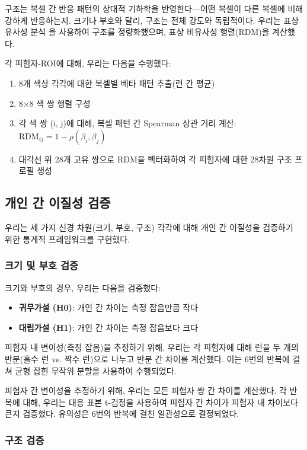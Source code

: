 \documentclass[12pt,a4paper]{article}
\begin{document}
구조는 복셀 간 반응 패턴의 상대적 기하학을 반영한다—어떤 복셀이 다른 복셀에 비해 강하게 반응하는지. 크기나 부호와 달리, 구조는 전체 강도와 독립적이다. 우리는 표상 유사성 분석 \parencite{Kriegeskorte2008}을 사용하여 구조를 정량화했으며, 표상 비유사성 행렬(RDM)을 계산했다.

각 피험자-ROI에 대해, 우리는 다음을 수행했다:
\begin{enumerate}
\item 8개 색상 각각에 대한 복셀별 베타 패턴 추출(런 간 평균)
\item 8×8 색 쌍 행렬 구성
\item 각 색 쌍 (i, j)에 대해, 복셀 패턴 간 Spearman 상관 거리 계산: $\text{RDM}_{ij} = 1 - \rho(\beta_i, \beta_j)$
\item 대각선 위 28개 고유 쌍으로 RDM을 벡터화하여 각 피험자에 대한 28차원 구조 프로필 생성
\end{enumerate}

\subsection{개인 간 이질성 검증}

우리는 세 가지 신경 차원(크기, 부호, 구조) 각각에 대해 개인 간 이질성을 검증하기 위한 통계적 프레임워크를 구현했다.

\subsubsection{크기 및 부호 검증}

크기와 부호의 경우, 우리는 다음을 검증했다:
\begin{itemize}
\item \textbf{귀무가설 (H0)}: 개인 간 차이는 측정 잡음만큼 작다
\item \textbf{대립가설 (H1)}: 개인 간 차이는 측정 잡음보다 크다
\end{itemize}

피험자 내 변이성(측정 잡음)을 추정하기 위해, 우리는 각 피험자에 대해 런을 두 개의 반분(홀수 런 vs. 짝수 런)으로 나누고 반분 간 차이를 계산했다. 이는 6번의 반복에 걸쳐 균형 잡힌 무작위 분할을 사용하여 수행되었다.

피험자 간 변이성을 추정하기 위해, 우리는 모든 피험자 쌍 간 차이를 계산했다. 각 반복에 대해, 우리는 대응 표본 t-검정을 사용하여 피험자 간 차이가 피험자 내 차이보다 큰지 검증했다. 유의성은 6번의 반복에 걸친 일관성으로 결정되었다.

\subsubsection{구조 검증}
\end{document}
